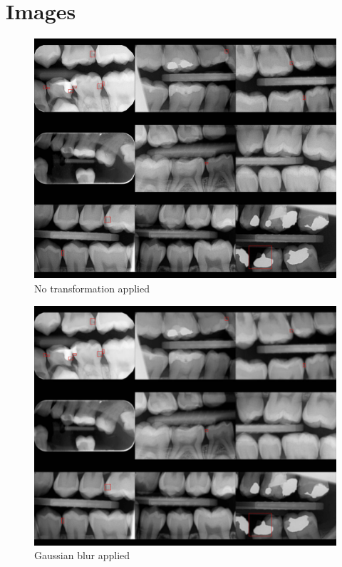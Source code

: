 \appendix


\chapter{Images}
\label{apendix:img_transformations}
\begin{figure}
    \includegraphics[width =0.9\linewidth]{images/no_trasnforms.jpg}
    \caption{No transformation applied}
\end{figure}
\begin{figure}
    \includegraphics[width =0.9\linewidth]{images/gaussian_blur.jpg}
    \caption{Gaussian blur applied}
\end{figure}
